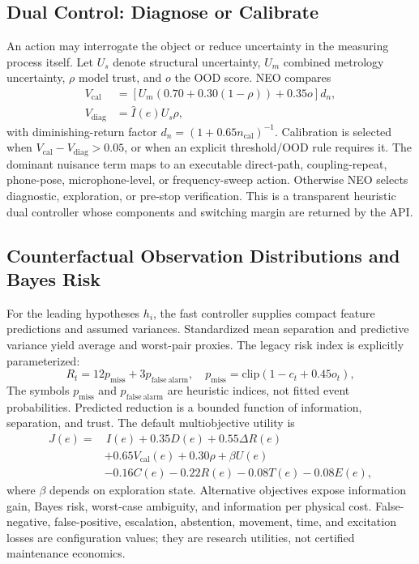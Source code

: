 \documentclass[conference]{IEEEtran}
\begin{document}
\subsection{Dual Control: Diagnose or Calibrate}
An action may interrogate the object or reduce uncertainty in the measuring process itself. Let $U_s$ denote structural uncertainty, $U_m$ combined metrology uncertainty, $\rho$ model trust, and $o$ the OOD score. NEO compares
\begin{align}
 V_{\mathrm{cal}}&=\left[U_m(0.70+0.30(1-\rho))+0.35o\right]d_n,\\
 V_{\mathrm{diag}}&=\hat I(e)U_s\rho,
 \label{eq:dual-control}
\end{align}
with diminishing-return factor $d_n=(1+0.65n_{\mathrm{cal}})^{-1}$. Calibration is selected when $V_{\mathrm{cal}}-V_{\mathrm{diag}}>0.05$, or when an explicit threshold/OOD rule requires it. The dominant nuisance term maps to an executable direct-path, coupling-repeat, phone-pose, microphone-level, or frequency-sweep action. Otherwise NEO selects diagnostic, exploration, or pre-stop verification. This is a transparent heuristic dual controller whose components and switching margin are returned by the API.

\subsection{Counterfactual Observation Distributions and Bayes Risk}
For the leading hypotheses $h_i$, the fast controller supplies compact feature predictions and assumed variances. Standardized mean separation and predictive variance yield average and worst-pair proxies. The legacy risk index is explicitly parameterized:
\begin{equation}
 R_t=12p_{\mathrm{miss}}+3p_{\mathrm{false\ alarm}},
 \quad p_{\mathrm{miss}}=\mathrm{clip}(1-c_t+0.45o_t),
 \label{eq:risk}
\end{equation}
The symbols $p_{\mathrm{miss}}$ and $p_{\mathrm{false\ alarm}}$ are heuristic indices, not fitted event probabilities. Predicted reduction is a bounded function of information, separation, and trust. The default multiobjective utility is
\begin{align}
 J(e)=&\,I(e)+0.35D(e)+0.55\Delta R(e)\nonumber\\
 &+0.65V_{\mathrm{cal}}(e)+0.30\rho+\beta U(e)\nonumber\\
 &-0.16C(e)-0.22R(e)-0.08T(e)-0.08E(e),
 \label{eq:neo-utility}
\end{align}
where $\beta$ depends on exploration state. Alternative objectives expose information gain, Bayes risk, worst-case ambiguity, and information per physical cost. False-negative, false-positive, escalation, abstention, movement, time, and excitation losses are configuration values; they are research utilities, not certified maintenance economics.
\end{document}
